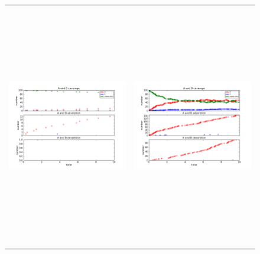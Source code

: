 \documentclass[11pt]{article}
\begin{document}
\setlength{\unitlength}{1in}
\begin{figure}[h!]
\begin{tabular}{cc}
\includegraphics[width=3.5in, height=4.2in]{./coadsorb/AtoBcoadsorb10x10_101_B2x__EA5E3_EB10E3_1.png} &
\includegraphics[width=3.5in, height=4.2in]{./coadsorb/AtoBcoadsorb10x10_201_B2x__EA5E3_EB10E3_1.png} \\

\end{tabular}
\end{figure}
\end{document}
